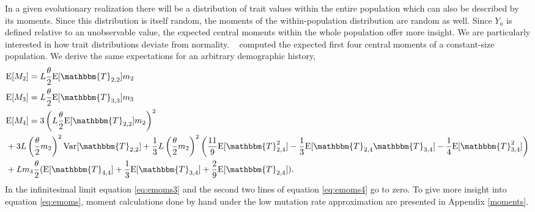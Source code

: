 In a given evolutionary realization there will be a distribution of trait values
within the entire population which can also be described by its moments. Since
this distribution is itself random, the moments of the within-population
distribution are random as well. Since $Y_a$ is defined relative to an
unobservable value, the expected central moments within the whole population
offer more insight. We are particularly interested in how trait distributions
deviate from normality. ~\citet{Schraiber2015} computed the expected first four
central moments of a constant-size population. We derive the same expectations
for an arbitrary demographic history,
\begin{subequations} \label{eq:emoms}
\begin{align}
  &\E[M_2] = L \T \E[\mathbbm{T}_{2,2}] m_2 \label{eq:emoms2}\\
  &\E[M_3] = L \T \E[\mathbbm{T}_{3,3}] m_3  \label{eq:emoms3}\\
  &\E[M_4] = 3\left(L \T \E[\mathbbm{T}_{2,2}] m_2\right)^2 \nonumber \\
  &+ 3L \left(\T m_2\right)^2\Var[\mathbbm{T}_{2,2}] + \frac{1}{3}
  L \left(\T m_2\right)^2
    \left( \frac{11}{9} \E[\mathbbm{T}_{2,4}^2]-\frac{1}{3}\E[\mathbbm{T}_{2,4}\mathbbm{T}_{3,4}]-
    \frac{1}{4}\E[\mathbbm{T}_{3,4}^2]\right) \nonumber \\
  &+ L m_4 \T ( \E[\mathbbm{T}_{4,4}] + \frac{1}{3} \E[\mathbbm{T}_{3,4}] +
    \frac{2}{9} \E[\mathbbm{T}_{2,4}] ).
  \label{eq:emoms4}
\end{align}
\end{subequations}
In the infinitesimal limit equation \eqref{eq:emoms3} and the second two lines
of equation \eqref{eq:emoms4} go to zero. To give more insight into equation
\eqref{eq:emoms}, moment calculations done by hand under the low mutation rate
approximation are presented in Appendix \ref{moments}.

